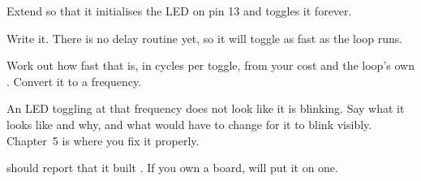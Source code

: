 \label{c2:ex:blink}
Extend  so that it initialises the LED on pin 13 and toggles it
forever.
\begin{parts}
  \item Write it. There is no delay routine yet, so it will toggle as fast as the loop runs.
  \item Work out how fast that is, in cycles per toggle, from your  cost and the
    loop's own . Convert it to a frequency.
  \item An LED toggling at that frequency does not look like it is blinking. Say what it looks like
    and why, and what would have to change for it to blink visibly. Chapter~5 is where you fix it
    properly.
  \item {} should report that it built . If you own a board,
     will put it on one.
\end{parts}
